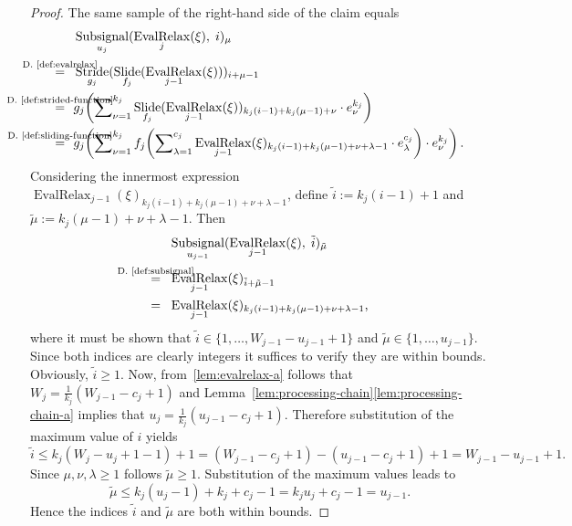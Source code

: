\documentclass[journal]{IEEEtran}
\newcommand{\discint}[2]{\{#1,\dotsc,#2\}}
\newcommand{\inint}[2]{\in\discint{#1}{#2}}
\DeclareMathOperator{\Subsignal}{Subsignal}
\DeclareMathOperator{\Slide}{Slide}
\DeclareMathOperator{\Stride}{Stride}
\newcommand{\equsing}[1]{\overset{\mathclap{\text{#1}}}{=}}
\DeclareMathOperator{\EvalRelax}{EvalRelax}
\begin{document}
\begin{proof}
The same sample of the right-hand side of the claim equals
\begin{align*}
  & \Subsignal_{u_j}(\EvalRelax_j(\xi),\; i)_\mu\\
  \equsing{D.~\ref{def:evalrelax}}\ \ & \Stride_{g_j}(\Slide_{f_j}(\EvalRelax_{j - 1}(\xi)))_{i + \mu - 1}\\
  \equsing{D.~\ref{def:strided-function}}\ \ & g_j\!\left( \sum\nolimits_{\nu = 1}^{k_j} \Slide_{f_j}(\EvalRelax_{j - 1}(\xi))_{k_j(i - 1) + k_j(\mu - 1) + \nu}\cdot e_\nu^{k_j} \right)\\
  \equsing{D.~\ref{def:sliding-function}}\ \ & g_j\!\left( \sum\nolimits_{\nu = 1}^{k_j} f_j\!\left(\sum\nolimits_{\lambda = 1}^{c_j} \EvalRelax_{j - 1}(\xi)_{k_j(i - 1) + k_j(\mu - 1) + \nu + \lambda - 1}\cdot e_\lambda^{c_j}\right)\cdot e_\nu^{k_j} \right)\text{.}
\end{align*}
Considering the innermost expression $\EvalRelax_{j - 1}(\xi)_{k_j(i - 1) + k_j(\mu - 1) + \nu + \lambda - 1}$, define $\tilde{i} := k_j(i - 1) + 1$ and $\tilde{\mu} := k_j(\mu - 1) + \nu + \lambda - 1$.
Then
\begin{align*}
  & \Subsignal_{u_{j - 1}}(\EvalRelax_{j - 1}(\xi),\; \tilde{i})_{\tilde{\mu}}\\
  \equsing{D.~\ref{def:subsignal}}\ \ & \EvalRelax_{j - 1}(\xi)_{\tilde{i} + \tilde{\mu} - 1}\\
  =\ \ & \EvalRelax_{j - 1}(\xi)_{k_j(i - 1) + k_j(\mu - 1) + \nu + \lambda - 1}\text{,}
\end{align*}
where it must be shown that $\tilde{i}\inint{1}{W_{j - 1} - u_{j - 1} + 1}$ and $\tilde{\mu}\inint{1}{u_{j - 1}}$.
Since both indices are clearly integers it suffices to verify they are within bounds.
Obviously, $\tilde{i}\geq 1$.
Now, from~\ref{lem:evalrelax-a} follows that $W_j = \frac{1}{k_j}(W_{j - 1} - c_j + 1)$ and Lemma~\ref{lem:processing-chain}\ref{lem:processing-chain-a} implies that $u_j = \frac{1}{k_j}(u_{j - 1} - c_j + 1)$.
Therefore substitution of the maximum value of $i$ yields
\begin{displaymath}
  \tilde{i}
  \leq k_j(W_j - u_j + 1 - 1) + 1
  = (W_{j - 1} - c_j + 1) - (u_{j - 1} - c_j + 1) + 1
  = W_{j - 1} - u_{j - 1} + 1\text{.}
\end{displaymath}
Since $\mu,\nu,\lambda\geq 1$ follows $\tilde{\mu}\geq 1$.
Substitution of the maximum values leads to
\begin{displaymath}
  \tilde{\mu}
  \leq k_j(u_j - 1) + k_j + c_j - 1
  =  k_j u_j + c_j - 1
  = u_{j - 1}\text{.}
\end{displaymath}
Hence the indices $\tilde{i}$ and $\tilde{\mu}$ are both within bounds.


\end{proof}
\end{document}
